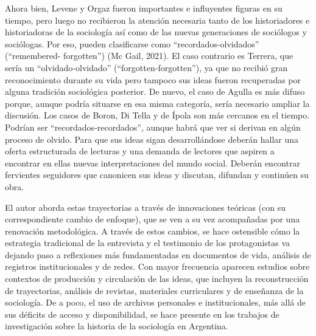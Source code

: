 Ahora bien, Levene y Orgaz fueron importantes e influyentes figuras en su tiempo, pero luego no recibieron la atención necesaria tanto de los historiadores e historiadoras de la sociología así como de las nuevas generaciones de sociólogos y sociólogas. Por eso, pueden clasificarse como ``recordados-olvidados'' (``remembered- forgotten'') \parencite{280-BARGHEER2024}(Mc Gail, 2021). El caso contrario es Terrera, que sería un ``olvidado-olvidado'' (``forgotten-forgotten''), ya que no recibió gran reconocimiento durante su vida pero tampoco sus ideas fueron recuperadas por alguna tradición sociológica posterior. De nuevo, el caso de Agulla es más difuso porque, aunque podría situarse en esa misma categoría, sería necesario ampliar la discusión. Los casos de Boron, Di Tella y de Ípola son más cercanos en el tiempo. Podrían ser ``recordados-recordados'', aunque habrá que ver si derivan en algún proceso de olvido. Para que sus ideas sigan desarrollándose deberán hallar una oferta estructurada de lecturas y una demanda de lectores que aspiren a encontrar en ellas nuevas interpretaciones del mundo social. Deberán encontrar fervientes seguidores que canonicen sus ideas y discutan, difundan y continúen su obra.

El autor aborda estas trayectorias a través de innovaciones teóricas (con su correspondiente cambio de enfoque), que se ven a su vez acompañadas por una renovación metodológica. A través de estos cambios, se hace ostensible cómo la estrategia tradicional de la entrevista y el testimonio de los protagonistas va dejando paso a reflexiones más fundamentadas en documentos de vida, análisis de registros institucionales y de redes. Con mayor frecuencia aparecen estudios sobre contextos de producción y circulación de las ideas, que incluyen la reconstrucción de trayectorias, análisis de revistas, materiales curriculares y de enseñanza de la sociología. De a poco, el uso de archivos personales e institucionales, más allá de sus déficits de acceso y disponibilidad, se hace presente en los trabajos de investigación sobre la historia de la sociología en Argentina.

